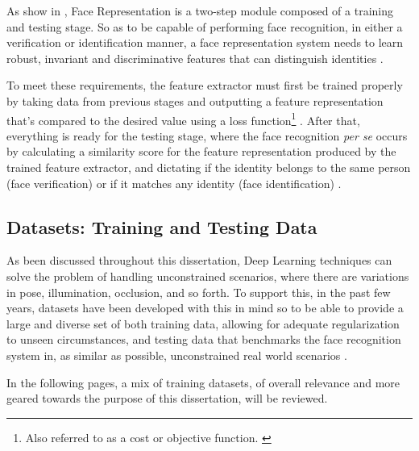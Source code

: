 \documentclass[class=report, crop=false, a4paper, 12pt]{standalone}
\begin{document}
\par As show in , Face Representation is a two-step module composed of a training and testing stage. So as to be capable of performing face recognition, in either a verification or identification manner, a face representation system needs to learn robust, invariant and discriminative features that can distinguish identities \autocite{ranjanDeepLearningUnderstanding2018}. 
\par To meet these requirements, the feature extractor must first be trained properly by taking data from previous stages and outputting a feature representation that's compared to the desired value using a loss function\footnote{Also referred to as a cost or objective function. \autocite{lecunDeepLearning2015}} \autocite{lecunDeepLearning2015, wangDeepFaceRecognition2021}. After that, everything is ready for the testing stage, where the face recognition \textit{per se} occurs by calculating a similarity score for the feature representation produced by the trained feature extractor, and dictating if the identity belongs to the same person (face verification) or if it matches any identity (face identification) \autocite{ranjanDeepLearningUnderstanding2018}.



\subsection{Datasets: Training and Testing Data}
\par As been discussed throughout this dissertation, Deep Learning techniques can solve the problem of handling unconstrained scenarios, where there are variations in pose, illumination, occlusion, and so forth. To support this, in the past few years, datasets have been developed with this in mind so to be able to provide a large and diverse set of both training data, allowing for adequate regularization to unseen circumstances, and testing data that benchmarks the face recognition system in, as similar as possible, unconstrained real world scenarios \autocite{duElementsEndtoendDeep2022}. 

\vspace{\baselineskip}
In the following pages, a mix of training datasets, of overall relevance and more geared towards the purpose of this dissertation, will be reviewed.
\end{document}
